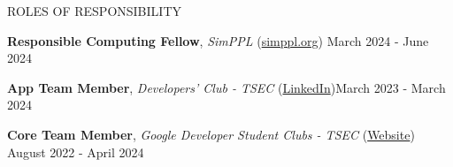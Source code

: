 \documentclass{resume} %
\begin{document}
\begin{rSection}{ROLES OF RESPONSIBILITY}

    \textbf{Responsible Computing Fellow}, \textit{SimPPL} (\href{https://simppl.org/}{simppl.org}) \hfill March 2024 - June 2024

    \textbf{App Team Member}, \textit{Developers' Club - TSEC} (\href{https://www.linkedin.com/in/developer-s-club-tsec/}{LinkedIn})\hfill March 2023 - March 2024

    \textbf{Core Team Member}, \textit{Google Developer Student Clubs - TSEC} (\href{https://gdsc.community.dev/thadomal-shahani-engineering-college-mumbai/}{Website})  \hfill August 2022 - April 2024

\end{rSection}
\end{document}
